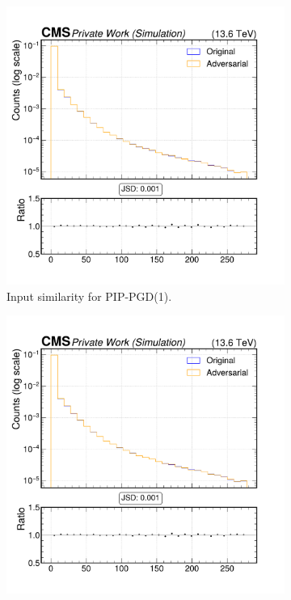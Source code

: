 \begin{figure}[h]
  \centering
  \begin{subfigure}[t]{0.32\textwidth}
    \includegraphics[width=\linewidth]{media/output/features/compare/combined_it_1/cmp_vtx_arr_sv_pt.pdf}
    \caption*{Input similarity for PIP-PGD(1).}
  \end{subfigure}\hfill
  \begin{subfigure}[t]{0.32\textwidth}
    \includegraphics[width=\linewidth]{media/output/features/compare/combined_it_2/cmp_vtx_arr_sv_pt.pdf}

\end{subfigure}
\end{figure}
